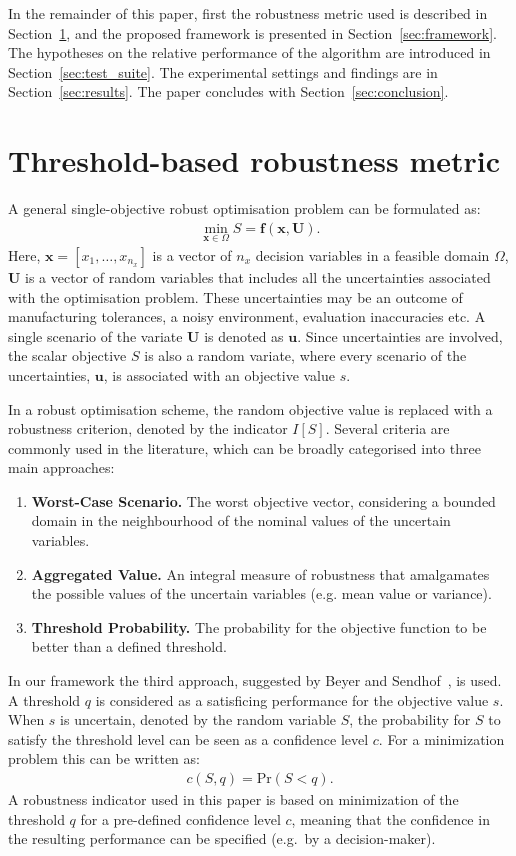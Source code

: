 \documentclass{llncs}
\newcommand{\brr}[1]{{\left({#1}\right)}} %
\newcommand{\I}[1]{I\!\left[{#1}\right]} %
\newcommand{\vx}{\mathbf{x}} %
\newcommand{\vf}{\mathbf{f}} %
\newcommand{\vu}{\mathbf{u}} %
\newcommand{\vU}{\mathbf{U}} %
\begin{document}
In the remainder of this paper, first the robustness metric used is described in Section~\ref{sec:robustness_metric}, and the proposed framework is presented in Section~\ref{sec:framework}. The hypotheses on the relative performance of the algorithm are introduced in Section~\ref{sec:test_suite}. The experimental settings and findings are in Section~\ref{sec:results}. The paper concludes with Section~\ref{sec:conclusion}.

\section{Threshold-based robustness metric}\label{sec:robustness_metric}

A general single-objective robust optimisation problem can be formulated as:
\begin{align}
\min_{\vx\in\Omega} S=\vf\brr{\vx,\vU}.
\label{eq:rev:robust}
\end{align}
Here, $\vx=[x_1,\ldots,x_{n_x}]$ is a vector of $n_x$ decision variables in a feasible domain $\Omega$, $\vU$ is a vector of random variables that includes all the uncertainties associated with the optimisation problem. These uncertainties may be an outcome of manufacturing tolerances, a noisy environment, evaluation inaccuracies etc. A single scenario of the variate $\vU$ is denoted as $\vu$. Since uncertainties are involved, the scalar objective $S$ is also a random variate, where every scenario of the uncertainties, $\vu$, is associated with an objective value $s$.

In a robust optimisation scheme, the random objective value is replaced with a robustness criterion, denoted by the indicator $\I{S}$. Several criteria are commonly used in the literature, which can be broadly categorised into three main approaches:
\begin{enumerate}
\item \textbf{Worst-Case Scenario.} The worst objective vector, considering a bounded domain in the neighbourhood of the nominal values of the uncertain variables.
\item \textbf{Aggregated Value.} An integral measure of robustness that amalgamates the possible values of the uncertain variables (e.g. mean value or variance).
\item \textbf{Threshold Probability.} The probability for the objective function to be better than a defined threshold.
\end{enumerate}

In our framework the third approach, suggested by Beyer and Sendhof~\cite{Beyer2007}, is used. A threshold $q$ is considered as a satisficing performance for the objective value $s$. When $s$ is uncertain, denoted by the random variable $S$, the probability for $S$ to satisfy the threshold level can be seen as a confidence level $c$. For a minimization problem this can be written as:
\begin{align}
c\brr{S,q}=\text{Pr}\brr{S<q}.
\label{eq:confidence}
\end{align}
A robustness indicator used in this paper is based on minimization of the threshold $q$ for a pre-defined confidence level $c$, meaning that the confidence in the resulting performance can be specified (e.g.~by a decision-maker).
\end{document}
